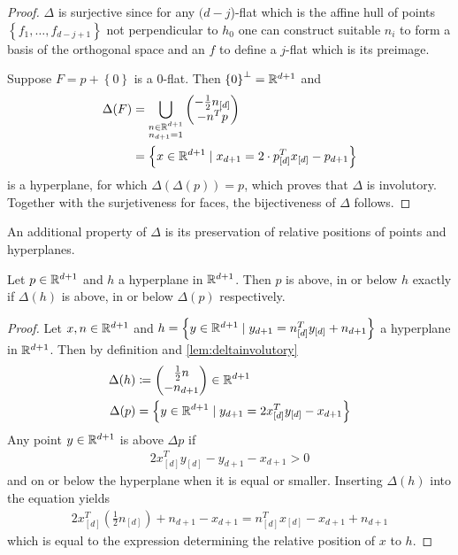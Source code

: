 \begin{proof}
    $\Delta$ is surjective since for any $(d - j$)-flat which is the affine hull of points $\left\{ f_1, \dots, f_{d - j + 1} \right\}$ not perpendicular to $h_0$ one can construct suitable $n_i$ to form a basis of the orthogonal space and an $f$ to define a $j$-flat which is its preimage.

    Suppose $F = p + \left\{ 0 \right\}$ is a $0$-flat.
    Then  $\left\{ 0 \right\}^\bot = \mathbb{R}^{d+1}$ and
    \begin{align}
        \Delta(F) &= \bigcup_{\substack{n \in \mathbb{R}^{d+1}\\n_{d+1} = 1}} \begin{pmatrix} -\frac{1}{2} n_{[d]}\\ -n^T p \end{pmatrix} \\
        &= \left\{ x \in \mathbb{R}^{d+1} \mid x_{d+1} = 2 \cdot p_{[d]}^Tx_{[d]} - p_{d+1} \right\}
    \end{align}
    is a hyperplane, for which $\Delta(\Delta(p)) = p$, which proves that $\Delta$ is involutory.
    Together with the surjetiveness for faces, the bijectiveness of $\Delta$ follows.
\end{proof}

An additional property of $\Delta$ is its preservation of relative positions of points and hyperplanes.
\begin{lemma}
    \label{lem:relativepositions}
    Let $p \in \mathbb{R}^{d+1}$ and $h$ a hyperplane in $\mathbb{R}^{d+1}$.
    Then $p$ is above, in or below $h$ exactly if $\Delta(h)$ is above, in or below $\Delta(p)$ respectively.
\end{lemma}
\begin{proof}
    Let $x,n \in \mathbb{R}^{d+1}$ and $h = \left\{ y \in \mathbb{R}^{d+1} \mid y_{d+1} = n_{[d]}^Ty_{[d]} + n_{d+1} \right\}$ a hyperplane in $\mathbb{R}^{d+1}$.
    Then by definition and \cref{lem:deltainvolutory}
    \begin{align}
        \Delta(h) &\coloneqq \begin{pmatrix} \frac{1}{2} n \\ -n_{d+1} \end{pmatrix}  \in \mathbb{R}^{d+1}\\
        \Delta(p) &= \left\{ y \in \mathbb{R}^{d+1} \mid y_{d+1} = 2x_{[d]}^Ty_{[d]} - x_{d+1} \right\}
    \end{align}
    Any point $y \in \mathbb{R}^{d+1}$ is above $\Delta{p}$ if
    \begin{align}
        2x_{[d]}^Ty_{[d]} - y_{d+1} - x_{d+1} > 0
    \end{align}
    and on or below the hyperplane when it is equal or smaller.
    Inserting $\Delta(h)$ into the equation yields
    \begin{align}
        2x_{[d]}^T \left( \frac{1}{2}n_{[d]} \right) + n_{d+1} - x_{d+1} = n_{[d]}^Tx_{[d]} - x_{d+1} + n_{d+1}
    \end{align}
    which is equal to the expression determining the relative position of $x$ to $h$.
\end{proof}

